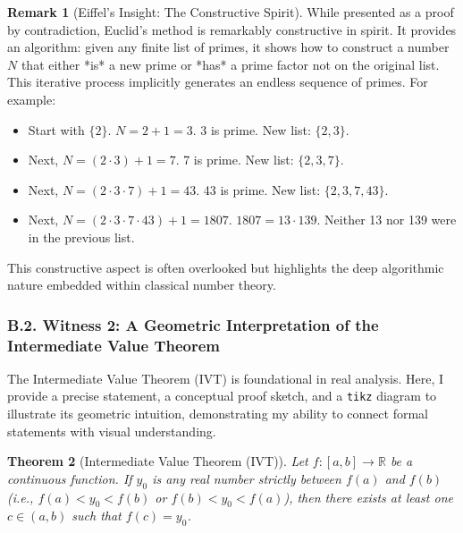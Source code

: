 \documentclass[11pt, a4paper]{article}
\theoremstyle{plain} %
\newtheorem{theorem}{Theorem}[section] %
\theoremstyle{definition} %
\newtheorem{remark}[theorem]{Remark}
\theoremstyle{remark} %
\begin{document}
\begin{remark}[Eiffel's Insight: The Constructive Spirit]
    While presented as a proof by contradiction, Euclid's method is remarkably constructive in spirit. It provides an algorithm: given any finite list of primes, it shows how to construct a number \( N \) that either *is* a new prime or *has* a prime factor not on the original list. This iterative process implicitly generates an endless sequence of primes. For example:
    \begin{itemize}
        \item Start with \( \{2\} \). \( N = 2+1 = 3 \). 3 is prime. New list: \( \{2,3\} \).
        \item Next, \( N = (2 \cdot 3)+1 = 7 \). 7 is prime. New list: \( \{2,3,7\} \).
        \item Next, \( N = (2 \cdot 3 \cdot 7)+1 = 43 \). 43 is prime. New list: \( \{2,3,7,43\} \).
        \item Next, \( N = (2 \cdot 3 \cdot 7 \cdot 43)+1 = 1807 \). \( 1807 = 13 \cdot 139 \). Neither 13 nor 139 were in the previous list.
    \end{itemize}
    This constructive aspect is often overlooked but highlights the deep algorithmic nature embedded within classical number theory.
\end{remark}

\subsubsection*{B.2. Witness 2: A Geometric Interpretation of the Intermediate Value Theorem}
\label{subsec:ivt_constructive}

The Intermediate Value Theorem (IVT) is foundational in real analysis. Here, I provide a precise statement, a conceptual proof sketch, and a \texttt{tikz} diagram to illustrate its geometric intuition, demonstrating my ability to connect formal statements with visual understanding.

\begin{theorem}[Intermediate Value Theorem (IVT)]
    \label{thm:ivt}
    Let \( f: [a,b] \to \mathbb{R} \) be a continuous function. If \( y_0 \) is any real number strictly between \( f(a) \) and \( f(b) \) (i.e., \( f(a) < y_0 < f(b) \) or \( f(b) < y_0 < f(a) \)), then there exists at least one \( c \in (a,b) \) such that \( f(c) = y_0 \).
\end{theorem}
\end{document}
